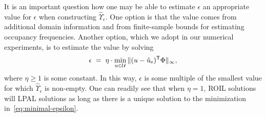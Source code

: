\documentclass[10pt]{article}
\theoremstyle{plain}
\theoremstyle{remark}
\begin{document}
It is an important question how one may be able to estimate $\epsilon$ an appropriate value for $\epsilon$ when constructing $\hat{\Upsilon}_{\epsilon}$. One option is that the value comes from additional domain information and from finite-sample bounds for estimating occupancy frequencies. Another option, which we adopt in our numerical experiments, is to estimate the value by solving
\begin{equation}\label{eq:minimal-epsilon}
 \epsilon \; =\;  \eta \cdot \min_{u\in \mathcal{U}}   \| (u - \hat{u}_{\mathrm{e}})^{\mathsf{T}} \Phi \|_{\infty}, 
\end{equation}
where $\eta \ge 1$ is some constant. In this way, $\epsilon$ is some multiple of the smallest value for which $\hat{\Upsilon}_{\epsilon}$ is non-empty. One can readily see that when $\eta = 1$, ROIL solutions will LPAL solutions as long as there is a unique solution to the minimization in~\eqref{eq:minimal-epsilon}.



\end{document}
